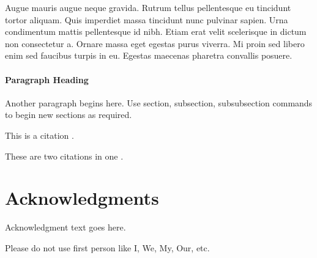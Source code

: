 \documentclass[fleqn, 11pt, twoside]{IOEGC}
\begin{document}
Augue mauris augue neque gravida. Rutrum tellus pellentesque eu tincidunt tortor aliquam. Quis imperdiet massa tincidunt nunc pulvinar sapien. Urna condimentum mattis pellentesque id nibh. Etiam erat velit scelerisque in dictum non consectetur a. Ornare massa eget egestas purus viverra. Mi proin sed libero enim sed faucibus turpis in eu. Egestas maecenas pharetra convallis posuere.

\paragraph{Paragraph Heading}
Another paragraph begins here. Use section, subsection, subsubsection commands
to begin new sections as required.

This is a citation \cite{lamport1994}.

These are two citations in one \cite{ltxprimer, oetiker2001not}.


\section*{Acknowledgments} 
Acknowledgment text goes here. 

Please do not use first person like I, We, My, Our, etc.





\vfill\null
\end{document}

